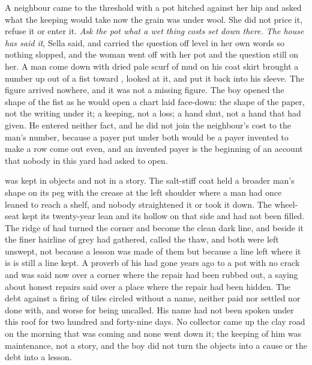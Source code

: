 A neighbour came to the threshold with a pot hitched against her hip and asked what the keeping would take now the grain was under wool. She did not price it, refuse it or enter it. \emph{Ask the pot what a wet thing costs set down there. The house has said it}, Sella said, and carried the question off level in her own words so nothing slopped, and the woman went off with her pot and the question still on her. A man come down  with dried pale scurf of mud on his coat skirt brought a number up out of a fist toward , looked at it, and put it back into his sleeve. The figure arrived nowhere, and it was not a missing figure. The boy opened the shape of the fist as he would open a chart laid face-down: the shape of the paper, not the writing under it; a keeping, not a loss; a hand shut, not a hand that had given. He entered neither fact, and he did not join the neighbour's cost to the man's number, because a payer put under both would be a payer invented to make a row come out even, and an invented payer is the beginning of an account that nobody in this yard had asked to open.

 was kept in objects and not in a story. The salt-stiff coat held a broader man's shape on its peg with the crease at the left shoulder where a man had once leaned to reach a shelf, and nobody straightened it or took it down. The wheel-seat kept its twenty-year lean and its hollow on that side and had not been filled. The ridge of  had turned the corner and become the clean dark line, and beside it the finer hairline of grey had gathered, called the thaw, and both were left unswept, not because a lesson was made of them but because a line left where it is is still a line kept. A proverb of his had gone years ago to a pot with no crack and was said now over a corner where the repair had been rubbed out, a saying about honest repairs said over a place where the repair had been hidden. The debt against a firing of tiles circled without a name, neither paid nor settled nor done with, and worse for being uncalled. His name had not been spoken under this roof for two hundred and forty-nine days. No collector came up the clay road on the morning that was coming and none went down it; the keeping of him was maintenance, not a story, and the boy did not turn the objects into a cause or the debt into a lesson.

\scenebreak

